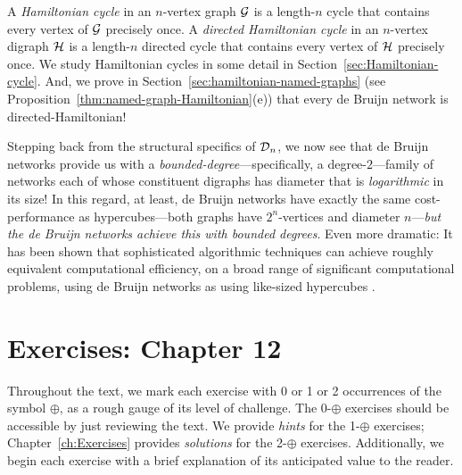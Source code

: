 \smallskip

 

A {\it Hamiltonian cycle} in an $n$-vertex graph $\mbox{$\cal G$}$ is a length-$n$ cycle that contains every vertex of $\mbox{$\cal G$}$ precisely once.  A {\it directed Hamiltonian cycle} in an $n$-vertex digraph $\mbox{$\cal H$}$ is a length-$n$ directed cycle that contains every vertex of $\mbox{$\cal H$}$ precisely once.  We study Hamiltonian cycles in some detail in Section~\ref{sec:Hamiltonian-cycle}.  And, we prove in Section~\ref{sec:hamiltonian-named-graphs} (see Proposition~\ref{thm:named-graph-Hamiltonian}(e)) that every de Bruijn network is directed-Hamiltonian!

\bigskip

Stepping back from the structural specifics of $\mbox{$\cal D$}_n$, we now see that de Bruijn networks provide us with a {\em bounded-degree}---specifically, a degree-$2$---family of networks each of whose constituent digraphs has diameter that is {\em logarithmic} in its size!  In this regard, at least, de Bruijn networks have exactly the same cost-performance as hypercubes---both graphs have $2^n$-vertices and diameter $n$---{\em but the de Bruijn networks achieve this with bounded degrees}.  Even more dramatic:  It has been shown that sophisticated algorithmic techniques can achieve roughly equivalent computational efficiency, on a broad range of significant computational problems, using de Bruijn networks as using like-sized hypercubes \cite{AnnexsteinBR90, BermondP89, Ullman84}.



\section{Exercises: Chapter 12}

Throughout the text, we mark each exercise with 0 or 1 or 2 occurrences of the symbol $\oplus$, as a rough gauge of its level of challenge.  The 0-$\oplus$ exercises should be accessible by just reviewing the text.  We provide {\em hints} for the 1-$\oplus$ exercises; Chapter~\ref{ch:Exercises} provides {\em solutions} for the 2-$\oplus$ exercises.  Additionally, we begin each exercise with a brief explanation of its anticipated value to the reader.

